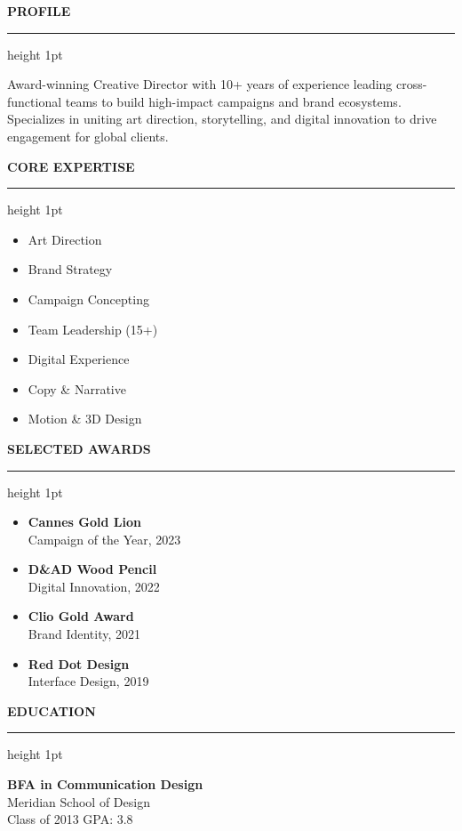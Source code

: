 \documentclass[10pt]{article}
\newcommand{\cvsidebarsection}[1]{%
  \vspace{1.4em}%
  {\fontsize{9.5}{11.5}\selectfont\color{primary}\textbf{\MakeUppercase{#1}}}\\[0.3em]%
  {\color{linecolor}\hrule height 1pt}%
  \vspace{0.6em}%
}
\begin{document}
\begin{minipage}[t]{0.28\textwidth}
  \cvsidebarsection{Profile}
  \fontsize{8.5}{11.5}\selectfont\color{secondary}%
  Award-winning Creative Director with 10+ years of experience leading cross-functional teams to build high-impact campaigns and brand ecosystems. Specializes in uniting art direction, storytelling, and digital innovation to drive engagement for global clients.
  
  \cvsidebarsection{Core Expertise}
  \fontsize{8.5}{11.5}\selectfont\color{secondary}%
  \begin{itemize}[leftmargin=1.0em, itemsep=3pt, parsep=0pt, topsep=0pt]
    \item Art Direction
    \item Brand Strategy
    \item Campaign Concepting
    \item Team Leadership (15+)
    \item Digital Experience
    \item Copy \& Narrative
    \item Motion \& 3D Design
  \end{itemize}
  
  \cvsidebarsection{Selected Awards}
  \fontsize{8.5}{11.5}\selectfont\color{secondary}%
  \begin{itemize}[leftmargin=1.0em, itemsep=3.5pt, parsep=0pt, topsep=0pt]
    \item \textbf{Cannes Gold Lion} \\ Campaign of the Year, 2023
    \item \textbf{D\&AD Wood Pencil} \\ Digital Innovation, 2022
    \item \textbf{Clio Gold Award} \\ Brand Identity, 2021
    \item \textbf{Red Dot Design} \\ Interface Design, 2019
  \end{itemize}
  
  \cvsidebarsection{Education}
  \fontsize{8.5}{11.5}\selectfont\color{secondary}%
  \textbf{BFA in Communication Design} \\
  Meridian School of Design \\
  Class of 2013 \hfill GPA: 3.8
\end{minipage}%
\hfill
\end{document}
